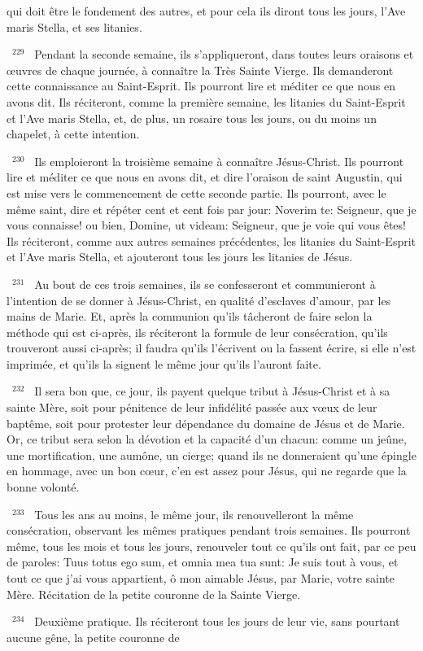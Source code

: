 \documentclass[paper=a5,pagesize=pdftex,fontsize=15pt,headinclude=on,twoside=off]{scrbook}
\newcommand{\negphantom}[1]{\settowidth{\dimen0}{#1}\hspace*{-\dimen0}}
\newcommand{\versenb}[1]{\par \vspace{10pt}~\negphantom{~${}^{#1}$~}${}^{#1}$~}
\begin{document}
qui doit être le fondement des autres, et pour cela ils diront tous les jours, l'Ave maris Stella, et ses litanies.
\versenb{229} Pendant la seconde semaine, ils s'appliqueront, dans toutes leurs oraisons et œuvres de chaque journée, à
connaître la Très Sainte Vierge. Ils demanderont cette connaissance au Saint-Esprit. Ils pourront lire et méditer ce
que nous en avons dit. Ils réciteront, comme la première semaine, les litanies du Saint-Esprit et l'Ave maris Stella,
et, de plus, un rosaire tous les jours, ou du moins un chapelet, à cette intention.
\versenb{230} Ils emploieront la troisième semaine à connaître Jésus-Christ. Ils pourront lire et méditer ce que nous en
avons dit, et dire l'oraison de saint Augustin, qui est mise vers le commencement de cette seconde partie. Ils
pourront, avec le même saint, dire et répéter cent et cent fois par jour: Noverim te: Seigneur, que je vous
connaisse! ou bien, Domine, ut videam: Seigneur, que je voie qui vous êtes! Ils réciteront, comme aux autres
semaines précédentes, les litanies du Saint-Esprit et l'Ave maris Stella, et ajouteront tous les jours les litanies de
Jésus.
\versenb{231} Au bout de ces trois semaines, ils se confesseront et communieront à l'intention de se donner à Jésus-Christ,
en qualité d'esclaves d'amour, par les mains de Marie. Et, après la communion qu'ils tâcheront de faire selon la
méthode qui est ci-après, ils réciteront la formule de leur consécration, qu'ils trouveront aussi ci-après; il faudra
qu'ils l'écrivent ou la fassent écrire, si elle n'est imprimée, et qu'ils la signent le même jour qu'ils l'auront faite.
\versenb{232} Il sera bon que, ce jour, ils payent quelque tribut à Jésus-Christ et à sa sainte Mère, soit pour pénitence de
leur infidélité passée aux vœux de leur baptême, soit pour protester leur dépendance du domaine de Jésus et de
Marie. Or, ce tribut sera selon la dévotion et la capacité d'un chacun: comme un jeûne, une mortification, une
aumône, un cierge; quand ils ne donneraient qu'une épingle en hommage, avec un bon cœur, c'en est assez pour
Jésus, qui ne regarde que la bonne volonté.
\versenb{233} Tous les ans au moins, le même jour, ils renouvelleront la même consécration, observant les mêmes
pratiques pendant trois semaines.
Ils pourront même, tous les mois et tous les jours, renouveler tout ce qu'ils ont fait, par ce peu de paroles: Tuus
totus ego sum, et omnia mea tua sunt: Je suis tout à vous, et tout ce que j'ai vous appartient, ô mon aimable
Jésus, par Marie, votre sainte Mère.
Récitation de la petite couronne de la Sainte Vierge.
\versenb{234} Deuxième pratique. Ils réciteront tous les jours de leur vie, sans pourtant aucune gêne, la petite couronne de
\end{document}
